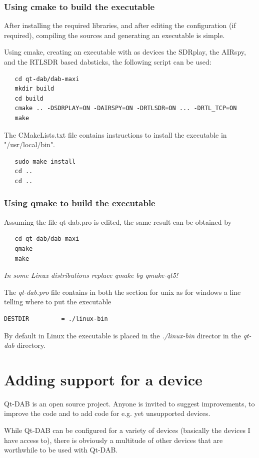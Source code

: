 \documentclass[12pt]{article}
\begin{document}
\subsubsection{Using cmake to build the executable}
After installing the required libraries, and after editing
the configuration (if required), compiling the sources and generating an
executable is simple.
\par
Using cmake, creating an executable with as devices the SDRplay, the
AIRspy, and the RTLSDR based dabsticks, the following script can be used:
{\small
\begin{verbatim}
   cd qt-dab/dab-maxi
   mkdir build
   cd build
   cmake .. -DSDRPLAY=ON -DAIRSPY=ON -DRTLSDR=ON ... -DRTL_TCP=ON
   make
\end{verbatim}
}
\par
The CMakeLists.txt file contains instructions to install the executable
in "/usr/local/bin".
{\small
\begin{verbatim}
   sudo make install
   cd ..
   cd ..
\end{verbatim}
}

\subsubsection{Using qmake to build the executable}
Assuming the file qt-dab.pro is edited, the same result can be
obtained by
{\small
\begin{verbatim}
   cd qt-dab/dab-maxi
   qmake
   make
\end{verbatim}
}
{\em In some Linux distributions replace  qmake by qmake-qt5!}
\par
The {\em qt-dab.pro} file contains in both the section for unix as for
windows a line telling where to put the executable
{\small
\begin{verbatim}
DESTDIR         = ./linux-bin
\end{verbatim}
}
By default in Linux the executable is placed in the
{\em ./linux-bin} director in the {\em qt-dab} directory.
\section{Adding support for a device}
Qt-DAB is an open source project. Anyone is invited to suggest
improvements, to improve the code and to add code for e.g. yet unsupported
devices.
\par
While Qt-DAB can be configured for a variety of devices (basically
the devices I have access to), there is obviously a multitude of other
devices that are worthwhile to be used with Qt-DAB.
\end{document}
